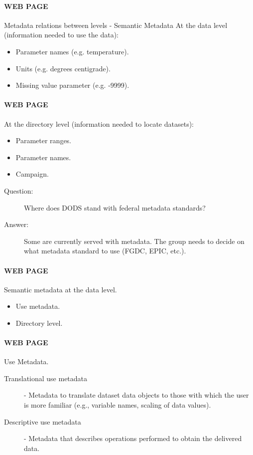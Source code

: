 \paragraph{WEB PAGE} Metadata relations between levels - Semantic Metadata
At the data level (information needed to use the data):
\begin{itemize}
\item Parameter names (e.g. temperature).
\item Units (e.g. degrees centigrade).
\item Missing value parameter (e.g. -9999).
\end{itemize}

\paragraph{WEB PAGE}  At the directory level (information needed to locate datasets):
\begin{itemize}
\item Parameter ranges.
\item Parameter names.
\item Campaign.
\end{itemize}

\begin{description}
\item[Question:]  Where does DODS stand with federal metadata standards?
\item[Answer:] Some are currently served with metadata.  The group
  needs to decide on what metadata standard to use (FGDC, EPIC, etc.).
\end{description}

\paragraph{WEB PAGE}  Semantic metadata at the data level.
\begin{itemize}
\item Use metadata.
\item Directory level.
\end{itemize}

\paragraph{WEB PAGE}  Use Metadata.
\begin{description}
\item[Translational use metadata] - Metadata to translate dataset data
  objects to those with which the user is more familiar (e.g.,
  variable names, scaling of data values).  
\item[Descriptive use metadata] - Metadata that describes operations
  performed to obtain the delivered data.  
\end{description}

